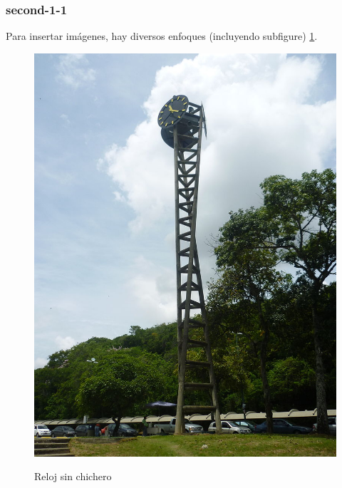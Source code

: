 \subsubsection{second-1-1}

Para insertar im\'agenes, hay diversos enfoques (incluyendo subfigure) \ref{fig:reloj}.

\begin{figure}[htpb!]
	\centering
	\includegraphics[width=0.5\columnwidth]{images/reloj.jpg}
	\label{fig:reloj}
	\caption{Reloj sin chichero}
\end{figure}

